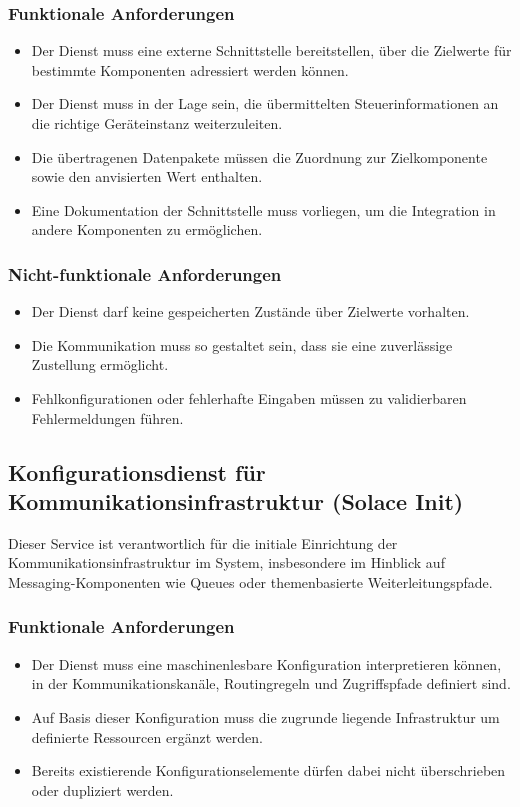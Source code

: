 \subsubsection{Funktionale Anforderungen}
\begin{itemize}
  \item Der Dienst muss eine externe Schnittstelle bereitstellen, über die Zielwerte für bestimmte Komponenten adressiert werden können.
  \item Der Dienst muss in der Lage sein, die übermittelten Steuerinformationen an die richtige Geräteinstanz weiterzuleiten.
  \item Die übertragenen Datenpakete müssen die Zuordnung zur Zielkomponente sowie den anvisierten Wert enthalten.
  \item Eine Dokumentation der Schnittstelle muss vorliegen, um die Integration in andere Komponenten zu ermöglichen.
\end{itemize}

\subsubsection{Nicht-funktionale Anforderungen}
\begin{itemize}
  \item Der Dienst darf keine gespeicherten Zustände über Zielwerte vorhalten.
  \item Die Kommunikation muss so gestaltet sein, dass sie eine zuverlässige Zustellung ermöglicht.
  \item Fehlkonfigurationen oder fehlerhafte Eingaben müssen zu validierbaren Fehlermeldungen führen.
\end{itemize}

\subsection{Konfigurationsdienst für Kommunikationsinfrastruktur (Solace Init)}

Dieser Service ist verantwortlich für die initiale Einrichtung der Kommunikationsinfrastruktur im System, insbesondere im Hinblick auf Messaging-Komponenten wie Queues oder themenbasierte Weiterleitungspfade.

\subsubsection{Funktionale Anforderungen}
\begin{itemize}
  \item Der Dienst muss eine maschinenlesbare Konfiguration interpretieren können, in der Kommunikationskanäle, Routingregeln und Zugriffspfade definiert sind.
  \item Auf Basis dieser Konfiguration muss die zugrunde liegende Infrastruktur um definierte Ressourcen ergänzt werden.
  \item Bereits existierende Konfigurationselemente dürfen dabei nicht überschrieben oder dupliziert werden.
\end{itemize}


